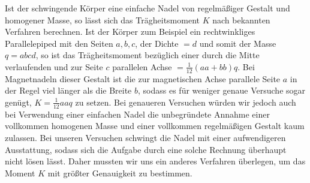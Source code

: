 Ist der schwingende Körper eine einfache Nadel von regelmäßiger Gestalt und homogener Masse, so lässt sich das Trägheitsmoment $K$ nach bekannten Verfahren berechnen. Ist der Körper zum Beispiel ein rechtwinkliges Parallelepiped mit den Seiten $a,b,c$, der Dichte $=d$ und somit der Masse $q=abcd$, so ist das Trägheitsmoment bezüglich einer durch die Mitte verlaufenden und zur Seite $c$ parallelen Achse $=\frac1{12}(aa+bb)q$. Bei Magnetnadeln dieser Gestalt ist die zur magnetischen Achse parallele Seite $a$ in der Regel viel länger als die Breite $b$, sodass es für weniger genaue Versuche sogar genügt, $K=\frac1{12}aaq$ zu setzen. Bei genaueren Versuchen würden wir jedoch auch bei Verwendung einer einfachen Nadel die unbegründete Annahme einer vollkommen homogenen Masse und einer vollkommen regelmäßigen Gestalt kaum zulassen. Bei unseren Versuchen schwingt die Nadel mit einer aufwendigeren Ausstattung, sodass sich die Aufgabe durch eine solche Rechnung überhaupt nicht lösen lässt. Daher mussten wir uns ein anderes Verfahren überlegen, um das Moment $K$ mit größter Genauigkeit zu bestimmen.

